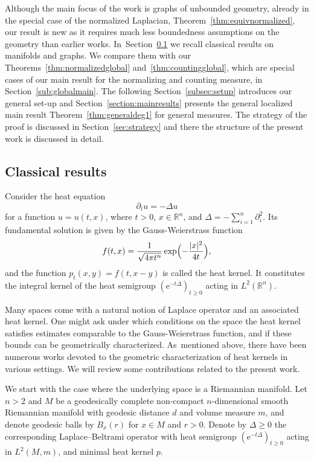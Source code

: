 \documentclass[10pt]{amsart}
\theoremstyle{plain}
\theoremstyle{definition}
\newcommand{\RR}{\mathbb{R}}
\newcommand{\euler}{\mathrm{e}}
\begin{document}
Although the main focus of the work is graphs of unbounded geometry, already in the special case of the normalized Laplacian, Theorem~\ref{thm:equivnormalized}, our result is new as it requires much less boundedness assumptions on the geometry than earlier works.
In~Section~\ref{sub:classical} we recall classical results on manifolds and graphs. We compare them with our Theorems~\ref{thm:normalizedglobal} and~\ref{thm:countingglobal}, which are special cases of our main result for the normalizing and counting measure, in Section~\ref{sub:globalmain}. The following Section~\ref{subsec:setup} introduces our general set-up and Section~\ref{section:mainresults} presents the general localized main result Theorem~\ref{thm:generaldeg1} for general measures. The strategy of the proof is discussed in Section~\ref{sec:strategy} and there the structure of the present work is discussed in detail.

\subsection{Classical results}\label{sub:classical}
Consider the heat equation
\[
\partial_t u =-\Delta u
\]
for a function $u=u(t,x)$, where $t>0$, $x\in \RR^n$, and $\Delta=-\sum_{i=1}^n\partial_i^2 $. Its fundamental solution is given by the Gauss-Weierstrass function
\[
f(t,x)=\frac{1}{\sqrt{4\pi t^n}}\exp\Bigl(-\frac{|x|^2}{4t}\Bigr),
\]
and the function $p_t(x,y)=f(t,x-y)$ is called the heat kernel. It constitutes the integral kernel of the heat semigroup $(\euler^{-t\Delta})_{t\geq 0}$ acting in $L^2(\RR^n)$.

Many spaces come with a natural notion of Laplace operator and an associated heat kernel. One might ask under which conditions on the space the heat kernel satisfies estimates comparable to the Gauss-Weierstrass function, and if these bounds can be geometrically characterized. As~mentioned above, there have been numerous works devoted to the geometric characterization of heat kernels in various settings. We will review some contributions related to the present work.

We start with the case where the underlying space is a Riemannian manifold.
Let $n>2$ and $M$ be a geodesically complete non-compact $n$-dimensional smooth Riemannian manifold with geodesic distance $d$ and volume measure $m$, and denote geodesic balls by $B_x(r)$ for $x\in M$ and $r>0$. Denote by $\Delta\geq 0$ the corresponding Laplace--Beltrami operator with heat semigroup $(\euler^{-t\Delta})_{t\geq 0}$ acting in $L^2(M,m)$, and minimal heat kernel $p$.
\end{document}
